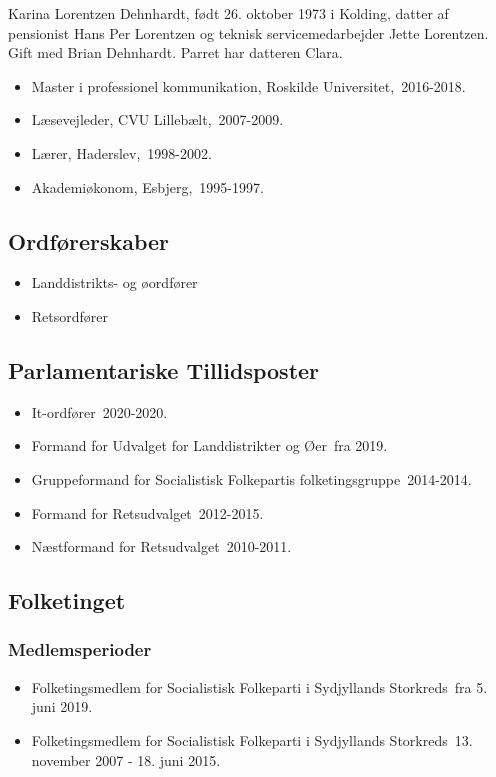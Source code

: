 \documentclass[11pt, a4paper]{awesome-cv}
\begin{document}
\makecvheader[R]
\makelettertitle
\begin{cvletter}
Karina Lorentzen Dehnhardt, født 26. oktober 1973 i Kolding, datter af pensionist Hans Per Lorentzen og teknisk servicemedarbejder Jette Lorentzen. Gift med Brian Dehnhardt. Parret har datteren Clara.

\begin{itemize}
\item Master i professionel kommunikation, Roskilde Universitet, 2016-2018.
\item Læsevejleder, CVU Lillebælt, 2007-2009.
\item Lærer, Haderslev, 1998-2002.
\item Akademiøkonom, Esbjerg, 1995-1997.
\end{itemize}
\subsection*{Ordførerskaber}
\begin{itemize}
\item Landdistrikts- og øordfører
\item Retsordfører
\end{itemize}
\subsection*{Parlamentariske Tillidsposter}
\begin{itemize}
\item It-ordfører 2020-2020.
\item Formand for Udvalget for Landdistrikter og Øer fra 2019.
\item Gruppeformand for Socialistisk Folkepartis folketingsgruppe 2014-2014.
\item Formand for Retsudvalget 2012-2015.
\item Næstformand for Retsudvalget 2010-2011.
\end{itemize}
\subsection*{Folketinget}
\subsubsection*{Medlemsperioder}
\begin{itemize}
\item Folketingsmedlem for Socialistisk Folkeparti i Sydjyllands Storkreds fra 5. juni 2019.
\item Folketingsmedlem for Socialistisk Folkeparti i Sydjyllands Storkreds 13. november 2007 - 18. juni 2015.
\end{itemize}

\end{cvletter}
\end{document}
